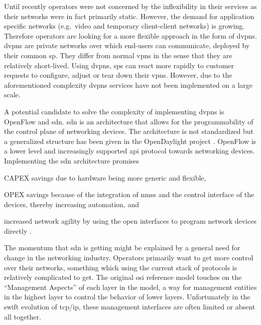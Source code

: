 Until recently operators were not concerned by the inflexibility in their services as their networks were in fact primarily static. However, the demand for application specific networks (e.g.\ video and temporary client-client networks) is growing. Therefore operators are looking for a more flexible approach in the form of \acp{dvpn}. \acp{dvpn} are private networks over which end-users can communicate, deployed by their common \ac{sp}. They differ from normal \acp{vpn} in the sense that they are relatively short-lived. Using \acp{dvpn}, \acp{sp} can react more rapidly to customer requests to configure, adjust or tear down their \acp{vpn}. However, due to the aforementioned complexity \acp{dvpn} services have not been implemented on a large scale.

A potential candidate to solve the complexity of implementing \acp{dvpn} is OpenFlow \cite{openflow} and \ac{sdn}. \ac{sdn} is an architecture that allows for the programmability of the control plane of networking devices. The architecture is not standardized but a generalized structure has been given in the OpenDaylight project \cite{opendaylight}. OpenFlow is a lower level and increasingly supported \ac{api} protocol towards networking devices. Implementing the \ac{sdn} architecture promises
\begin{inparaenum}
	\item CAPEX savings due to hardware being more generic and flexible,
	\item OPEX savings because of the integration of \acp{nms} and the control interface of the devices, thereby increasing automation, and
	\item increased network agility by using the open interfaces to program network devices directly \cite{packet-circuit}.
	\end{inparaenum} 

	
The momentum that \ac{sdn} is getting might be explained by a general need for change in the networking industry. Operators primarily want to get more control over their networks, something which using the current stack of protocols is relatively complicated to get. The original \acs{osi} reference model \cite{zimmermann} touches on the ``Management Aspects'' of each layer in the model, a way for management entities in the highest layer to control the behavior of lower layers. Unfortunately in the swift evolution of \ac{tcp}/\ac{ip}, these management interfaces are often limited or absent all together. 



